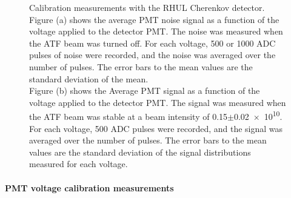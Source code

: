 \begin{figure}
{Calibration measurements with the RHUL Cherenkov detector.
\\Figure (a) shows the average PMT noise signal as a function of the voltage applied to the detector PMT.
The noise was measured when the ATF beam was turned off. 
For each voltage, 500 or 1000 ADC pulses of noise were recorded, and the noise was averaged over the number of pulses. 
The error bars to the mean values are the standard deviation of the mean.
\\Figure (b) shows the Average PMT signal as a function of the voltage applied to the detector PMT. 
The signal was measured when the ATF beam was stable at a beam intensity of \num{0.15}$\pm$\num{0.02e10}. 
For each voltage, 500 ADC pulses were recorded, and the signal was averaged over the number of pulses. 
The error bars to the mean values are the standard deviation of the signal distributions measured for each voltage.}
\label{fig:AverageNoise_VoltageNormalization}
\end{figure}

\paragraph{PMT voltage calibration measurements}

